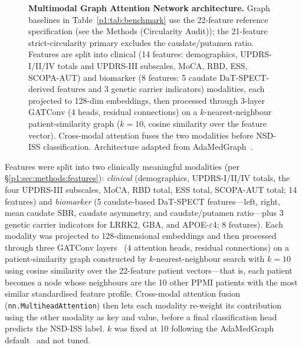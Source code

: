 \documentclass[10pt,letterpaper]{article}
\begin{document}
\begin{figure}[!t]
\centering
\caption{\textbf{Multimodal Graph Attention Network architecture.} Graph baselines in Table~\ref{p1:tab:benchmark} use the 22-feature reference specification (see the Methods (Circularity Audit)); the 21-feature strict-circularity primary excludes the caudate/putamen ratio. Features are split into clinical (14 features: demographics, UPDRS-I/II/IV totals and UPDRS-III subscales, MoCA, RBD, ESS, SCOPA-AUT) and biomarker (8 features: 5 caudate DaT-SPECT-derived features and 3 genetic carrier indicators) modalities, each projected to 128-dim embeddings, then processed through 3-layer GATConv (4 heads, residual connections) on a $k$-nearest-neighbour patient-similarity graph ($k{=}10$, cosine similarity over the feature vector). Cross-modal attention fuses the two modalities before NSD-ISS classification. Architecture adapted from AdaMedGraph~\cite{adamedgraph}.}
\label{p1:fig:architecture}
\end{figure}

Features were split into two clinically meaningful modalities (per \S\ref{p1:sec:methods:features}): \textit{clinical} (demographics, UPDRS-I/II/IV totals, the four UPDRS-III subscales, MoCA, RBD total, ESS total, SCOPA-AUT total; 14 features) and \textit{biomarker} (5 caudate-based DaT-SPECT features---left, right, mean caudate SBR, caudate asymmetry, and caudate/putamen ratio---plus 3 genetic carrier indicators for LRRK2, GBA, and APOE-$\varepsilon$4; 8 features). Each modality was projected to 128-dimensional embeddings and then processed through three GATConv layers~\cite{velickovic2018gat} (4 attention heads, residual connections) on a patient-similarity graph constructed by $k$-nearest-neighbour search with $k{=}10$ using cosine similarity over the 22-feature patient vectors---that is, each patient becomes a node whose neighbours are the 10 other PPMI patients with the most similar standardised feature profile. Cross-modal attention fusion (\texttt{nn.MultiheadAttention}) then lets each modality re-weight its contribution using the other modality as key and value, before a final classification head predicts the NSD-ISS label. $k$ was fixed at 10 following the AdaMedGraph default~\cite{adamedgraph} and not tuned.
\end{document}
